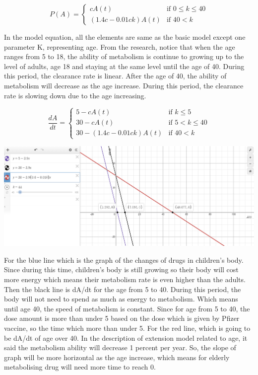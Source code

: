 \documentclass{article}
\begin{document}
\begin{equation}
  P(A) =
    \begin{cases}
      cA(t) & \text{if  $0 \leq k \leq 40$}\\
      (1.4c-0.01ck)A(t) & \text{if $40 < k$}
    \end{cases}       
\end{equation}

In the model equation, all the elements are same as the basic model except one parameter K, representing age. From the research, notice that when the age ranges from 5 to 18, the ability of metabolism is continue to growing up to the level of adults, age 18 and staying at the same level until the age of 40. During this period, the clearance rate is linear. After the age of 40, the ability of metabolism will decrease as the age increase. During this period, the clearance rate is slowing down due to the age increasing.

\begin{equation}
  \frac{dA}{dt} =
    \begin{cases}
      5-cA(t) & \text{if  $k \leq 5$}\\
      30-cA(t) & \text{if $5 < k \leq 40 $}\\
      30- (1.4c-0.01ck)A(t) & \text{if $40 < k$}
    \end{cases}       
\end{equation}

\includegraphics[scale = 0.4]{extension general graph.png}

For the blue line which is the graph of the changes of drugs in children's body. Since during  this time, children's body is still growing so their body will cost more energy which means their metabolism rate is even higher than the adults. Then the black line is dA/dt for the age from 5 to 40. During this period, the body will not need to spend as much as energy to metabolism. Which means until age 40, the speed of metabolism is constant. Since for age from 5 to 40, the dose amount is more than under 5 based on the dose which is given by Pfizer vaccine, so the time which more than under 5. For the red line, which is going to be dA/dt of age over 40. In the description of extension model related to age, it said the metabolism ability will decrease 1 percent per year. So, the slope of graph will be more horizontal as the age increase, which means for elderly metabolising drug will need more time to reach 0.
\end{document}
